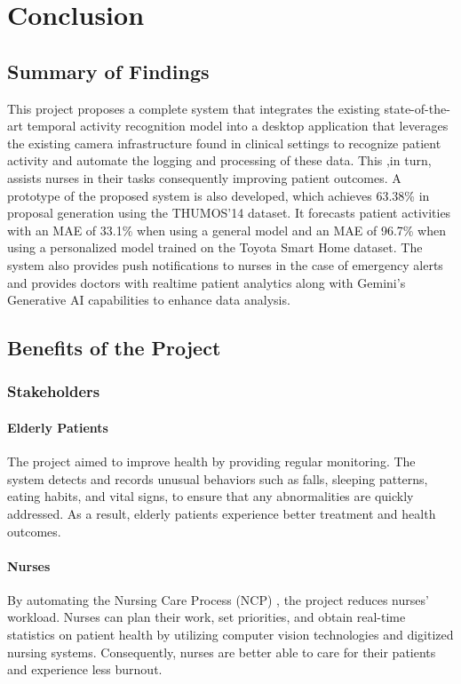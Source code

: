 
\chapter{Conclusion} %
\label{Chapter7}
\section{Summary of Findings}
This project proposes a complete system that integrates the existing state-of-the-art temporal activity recognition model into a desktop application that leverages the existing camera infrastructure found in clinical settings to recognize patient activity and automate the logging and processing of these data. This ,in turn, assists  nurses in their tasks consequently improving patient outcomes. A prototype of the proposed system is also developed, which achieves 63.38\%  in proposal generation using the THUMOS'14 dataset. It forecasts  patient activities with an MAE of 33.1\% when using a general model and an MAE of 96.7\% when using a personalized model trained on the Toyota Smart Home dataset. The system also provides push notifications to nurses in the case of emergency alerts and provides doctors with realtime patient analytics along with Gemini's Generative AI capabilities to enhance data analysis.
\section{Benefits of the Project}
\subsection{Stakeholders}
\subsubsection{Elderly Patients}
The project aimed to improve  health by providing regular monitoring. The system detects and records unusual behaviors such as falls, sleeping patterns, eating habits, and vital signs, to ensure that any abnormalities are quickly addressed. As a result, elderly patients experience better treatment and  health outcomes.
\subsubsection{Nurses}
By automating the Nursing Care Process (NCP) , the project reduces nurses' workload. Nurses can plan their work, set priorities, and obtain real-time statistics on patient health by utilizing computer vision technologies and digitized nursing systems. Consequently, nurses are better able to care for their patients and experience less burnout.
